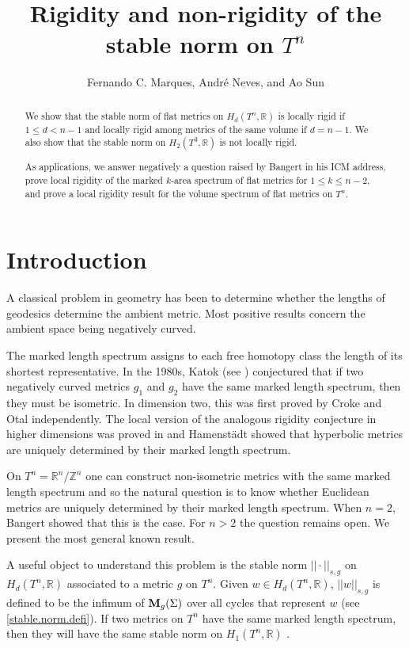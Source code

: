 \documentclass[11pt]{amsart}
\title[]{Rigidity and non-rigidity of the stable norm on $T^n$}
\author{Fernando C. Marques, Andr\'e Neves, and Ao Sun}
\def\R{\mathbb R}
\def\Z{\mathbb Z}
\theoremstyle{remark}
\theoremstyle{definition}
\begin{document}
	\maketitle
	\begin{abstract}
		We show that the stable norm of flat metrics on $H_{d}(T^n,\R)$  is locally rigid if $1\leq d<n-1$ and locally rigid among metrics of the same volume if $d=n-1$. We also show that the stable norm on  $H_{2}(T^3,\R)$ is not locally rigid.
		
		As applications, we answer negatively a question raised by Bangert in his ICM address,  prove local rigidity of the marked $k$-area spectrum of flat metrics for $1\leq k\leq n-2$, and prove a local rigidity result for the volume spectrum of flat metrics on $T^n$.
	\end{abstract}
	\section{Introduction}
	A classical problem in geometry has been to determine whether the lengths of geodesics determine the ambient metric. Most positive results concern the ambient space being negatively curved. 
	
	The marked length spectrum assigns to each free homotopy class the length of its shortest representative.
	In the 1980s, Katok (see \cite{BurnsKatok}) conjectured that if two negatively curved metrics $g_1$ and $g_2$ have the same marked length spectrum, then they must be isometric. In dimension two, this was first proved by Croke \cite{Croke} and Otal \cite{Otal} independently. The local version of the analogous rigidity conjecture in higher dimensions was proved in \cite{GuillarmouLefeuvre} and Hamenst\"adt \cite{Hamenstaedt1999} showed that hyperbolic metrics are uniquely determined by their marked length spectrum.
	
	On $T^n=\R^n/\Z^n$ one can construct non-isometric metrics with the same marked length spectrum and so the natural question is to know whether Euclidean metrics are uniquely determined by their marked length spectrum. When $n=2$, Bangert \cite[Theorem 6.1]{bangert} showed that this is the case. For $n>2$ the question remains open. We present the most general known result.
	
	A useful object to understand this problem is the stable norm $||\cdot||_{s,g}$ on $H_d(T^n,\R)$ associated to a metric $g$ on $T^n$. Given $w\in H_d(T^n,\R)$, $||w||_{s,g}$ is defined to be the infimum of ${\bf M}_g(\Sigma)$ over all cycles that represent $w$ (see \eqref{stable.norm.defi}). If two metrics on $T^n$ have the same marked length spectrum, then they will have the same stable norm on $H_1(T^n,\R)$ \cite[Proposition~2.1]{Bangert1990}.
	
\end{document}
